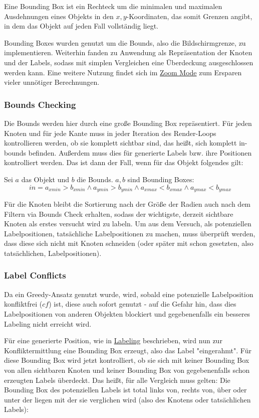 
Eine Bounding Box ist ein Rechteck um die minimalen und maximalen Ausdehnungen eines Objekts in den $x,y$-Koordinaten,
das somit Grenzen angibt, in dem das Objekt auf jeden Fall vollständig liegt.

Bounding Boxes wurden genutzt um die Bounds, also die Bildschirmgrenze, zu implementieren.
Weiterhin fanden zu Anwendung als Repräsentation der Knoten und der Labels, sodass mit simplen Vergleichen
eine Überdeckung ausgeschlossen werden kann.
Eine weitere Nutzung findet sich im \hyperref[subsec:zoom]{Zoom Mode} zum Ersparen vieler unnötiger Berechnungen.

\subsubsection{Bounds Checking}
Die Bounds werden hier durch eine große Bounding Box repräsentiert.
Für jeden Knoten und für jede Kante muss in jeder Iteration des
Render-Loops kontrollieren werden, ob sie komplett sichtbar sind, das heißt, sich komplett in-bounds befinden.
Außerdem muss dies für generierte Labels bzw. ihre Positionen kontrolliert werden.
Das ist dann der Fall, wenn für das Objekt folgendes gilt:

Sei $a$ das Objekt und $b$ die Bounds. $a,b$ sind Bounding Boxes:
$$    in = a_{xmin} > b_{xmin} \wedge a_{ymin} > b_{ymin} \wedge a_{xmax} < b_{xmax} \wedge a_{ymax} < b_{ymax} $$


Für die Knoten bleibt die Sortierung nach der Größe der Radien auch nach dem Filtern via Bounds Check erhalten,
sodass der wichtigste, derzeit sichtbare Knoten als erstes versucht wird zu labeln.
Um aus dem Versuch, als potenziellen Labelpositionen, tatsächliche Labelpositionen zu machen, muss überprüft werden,
dass diese sich nicht mit Knoten schneiden (oder später mit schon gesetzten, also tatsächlichen, Labelpositionen).

\subsubsection{Label Conflicts}
\label{subsubsec:label_conflict}
Da ein Greedy-Ansatz genutzt wurde, wird, sobald eine potenzielle Labelposition konfliktfrei ($cf$) ist, diese auch sofort genutzt -
auf die Gefahr hin, dass dies Labelpositionen von anderen Objekten blockiert und gegebenenfalls ein besseres Labeling nicht erreicht wird.

Für eine generierte Position, wie in \hyperref[sec:labeling]{Labeling} beschrieben, wird nun zur Konfliktermittlung eine Bounding Box erzeugt, also das Label "eingerahmt".
Für diese Bounding Box wird jetzt kontrolliert, ob sie sich mit keiner Bounding Box von allen sichtbaren Knoten und keiner Bounding Box von gegebenenfalls schon erzeugten Labels überdeckt.
Das heißt, für alle Vergleich muss gelten: Die Bounding Box des potenziellen Labels ist total links von, rechts von, über oder unter der liegen mit der sie verglichen wird (also des Knotens oder tatsächlichen Labels):

